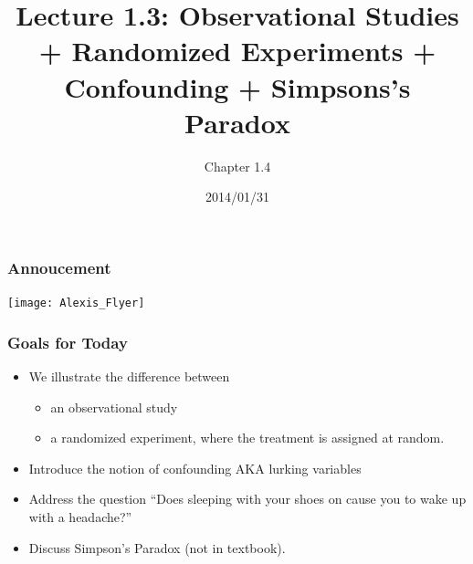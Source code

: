 \documentclass[slides]{beamer}\usepackage[]{graphicx}\usepackage[]{color}
\title{Lecture 1.3: Observational Studies + Randomized Experiments + Confounding + Simpsons's Paradox}
\author{Chapter 1.4}
\date{2014/01/31}
\newcommand{\blue}[1]{\textcolor{blue2}{#1}}
\begin{document}
\begin{frame}
\titlepage
\end{frame}


\begin{frame}
\frametitle{Annoucement}

\begin{center}
\texttt{[image: Alexis\_Flyer]}
\end{center}

\end{frame}


\begin{frame}
\frametitle{Goals for Today}

\begin{itemize}
\item We illustrate the difference between
\begin{itemize}
  \item an \blue{observational study}
  \item a \blue{randomized experiment}, where the treatment is assigned at random.
\end{itemize}
\pause\item Introduce the notion of confounding AKA lurking variables
\pause\item Address the question ``Does sleeping with your shoes on cause you to wake up with a headache?''
\pause\item Discuss \blue{Simpson's Paradox} (not in textbook).
\end{itemize}

\end{frame}
\end{document}
